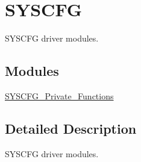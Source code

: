 \hypertarget{group___s_y_s_c_f_g}{\section{S\-Y\-S\-C\-F\-G}
\label{group___s_y_s_c_f_g}
}


S\-Y\-S\-C\-F\-G driver modules.  


\subsection*{Modules}
\begin{DoxyCompactItemize}
\item 
\hyperlink{group___s_y_s_c_f_g___private___functions}{S\-Y\-S\-C\-F\-G\-\_\-\-Private\-\_\-\-Functions}
\end{DoxyCompactItemize}


\subsection{Detailed Description}
S\-Y\-S\-C\-F\-G driver modules. 